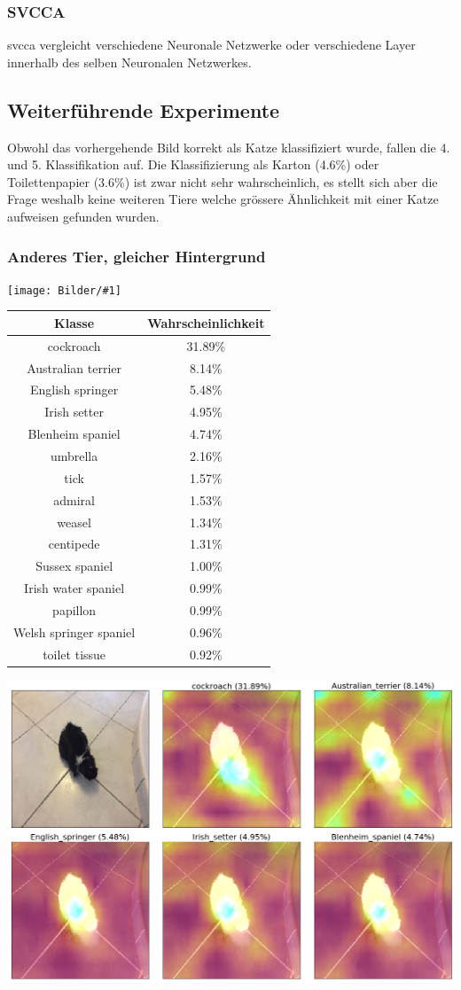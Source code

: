 \documentclass[
  12pt, %
  a4paper, %
  oneside, %
  openany, 
  numbers=noenddot, %
  BCOR=5mm, %
  parskip=half*, %
  thesis, %
]{bfhbook}
\newcommand{\imgText}[2]{
\begin{center}
    \begin{minipage}[t]{0.6\textwidth}
    		\vspace{0pt}
		\texttt{[image: Bilder/\#1]}
	\end{minipage}\hfill
    \begin{minipage}[t]{0.4\textwidth}
    		\vspace{0pt}
  		#2
    \end{minipage}
\end{center}
}
\begin{document}
\subsubsection*{SVCCA}
\acrfull{svcca} vergleicht verschiedene Neuronale Netzwerke oder verschiedene Layer innerhalb des selben Neuronalen Netzwerkes.

\subsection*{Weiterführende Experimente}
Obwohl das vorhergehende Bild korrekt als Katze klassifiziert wurde, fallen die 4. und 5. Klassifikation auf. Die Klassifizierung als Karton (4.6\%) oder Toilettenpapier (3.6\%) ist zwar nicht sehr wahrscheinlich, es stellt sich aber die Frage weshalb keine weiteren Tiere welche grössere Ähnlichkeit mit einer Katze aufweisen gefunden wurden.

\subsubsection*{Anderes Tier, gleicher Hintergrund}
\imgText{IMG_2729.JPG}{
	\begin{tabular}{ |c|c| } 
		 \hline
		 Klasse & Wahrscheinlichkeit \\
		 \hline
		cockroach & 31.89\% \\
		Australian terrier &  8.14\% \\
		English springer & 5.48\% \\
		Irish setter & 4.95\% \\
		Blenheim spaniel & 4.74\% \\
		umbrella & 2.16\% \\
		tick & 1.57\% \\
		admiral & 1.53\% \\
		weasel  & 1.34\% \\
		centipede & 1.31\% \\
		Sussex spaniel & 1.00\% \\
		Irish water spaniel  & 0.99\% \\
		papillon & 0.99\% \\
		Welsh springer spaniel  & 0.96\% \\
		toilet tissue & 0.92\% \\
		\end{tabular}
}
\break
\includegraphics[width=\textwidth]{Bilder/Oreo-Grad-Cam-Classes.png}
\end{document}
